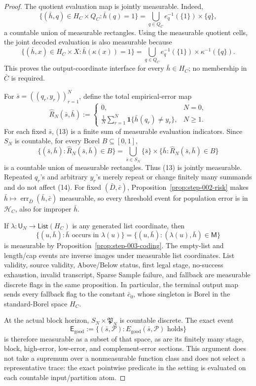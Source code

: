 \begin{proof}
The quotient evaluation map is jointly measurable. Indeed,
\[
\{(\bar h,q)\in H_C\times Q_C:\bar h(q)=1\}
=\bigcup_{q\in Q_C}
e_q^{-1}(\{1\})\times\{q\},
\tag{11}
\]
a countable union of measurable rectangles. Using the measurable quotient
cells, the joint decoded evaluation is also measurable because
\[
\{(\bar h,x)\in H_C\times X:\bar h(\kappa(x))=1\}
=\bigcup_{q\in Q_C}
e_q^{-1}(\{1\})\times\kappa^{-1}(\{q\}).
\tag{12}
\]
This proves the output-coordinate interface for every
\(\bar h\in H_C\); no membership in \(\bar C\) is required.

For \(\bar s=((q_r,y_r))_{r=1}^N\), define the total empirical-error map
\[
\widehat R_N(\bar s,\bar h):=
\begin{cases}
0,&N=0,\\[2pt]
\displaystyle\frac1N\sum_{r=1}^N
\mathbf1\{\bar h(q_r)\ne y_r\},&N\ge1.
\end{cases}
\tag{13}
\]
For each fixed \(\bar s\), (13) is a finite sum of measurable evaluation
indicators. Since \(S_N\) is countable, for every Borel
\(B\subseteq[0,1]\),
\[
\{(\bar s,\bar h):\widehat R_N(\bar s,\bar h)\in B\}
=\bigcup_{\bar s\in S_N}
\{\bar s\}\times
\{\bar h:\widehat R_N(\bar s,\bar h)\in B\}
\tag{14}
\]
is a countable union of measurable rectangles. Thus (13) is jointly
measurable. Repeated \(q_r\)'s and arbitrary \(y_r\)'s merely repeat or
change finitely many summands and do not affect (14). For fixed
\((\bar D,\bar c)\), Proposition~\ref{prop:step-002-risk} makes
\(\bar h\mapsto\operatorname{err}_{\bar D}(\bar h,\bar c)\) measurable,
so every threshold event for population error is in \(\mathcal H_C\), also
for improper \(\bar h\).

If \(\lambda:\mathsf U_N\to\mathsf{List}(H_C)\) is any generated list
coordinate, then
\[
\{(u,\bar h):\bar h\text{ occurs in }\lambda(u)\}
=\{(u,\bar h):(\lambda(u),\bar h)\in\mathsf M\}
\tag{15}
\]
is measurable by Proposition~\ref{prop:step-003-coding}. The empty-list and
length/cap events are inverse images under measurable list coordinates.
List validity, source validity, Above/Below status, first legal stage,
no-success exhaustion, invalid transcript, Sparse Sample failure, and
fallback are measurable discrete flags in the same proposition. In
particular, the terminal output map sends every fallback flag to the
constant \(\bar c_0\), whose singleton is Borel in the standard-Borel space
\(H_C\).

At the actual block horizon, \(S_N\times\mathfrak P_N\) is countable
discrete. The exact event
\[
\mathsf E_{\mathrm{good}}
:=\{(\bar s,\mathcal P):
E_{\mathrm{good}}(\bar s,\mathcal P)\text{ holds}\}
\tag{16}
\]
is therefore measurable as a subset of that space, as are its finitely many
stage, block, high-error, low-error, and complement-error sections. This
argument does not take a supremum over a nonmeasurable function class and
does not select a representative trace: the exact pointwise predicate in
the setting is evaluated on each countable input/partition atom.


\end{proof}
